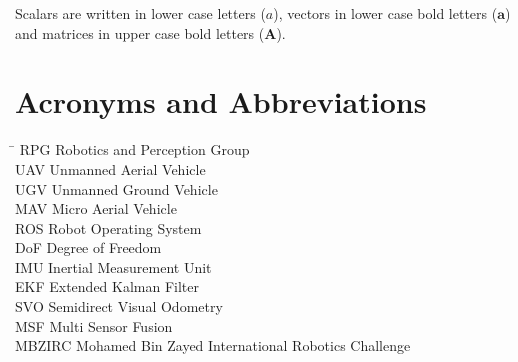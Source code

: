 Scalars are written in lower case letters ($a$), vectors in lower case bold letters ($\mathbf{a}$) and matrices in upper case bold letters ($\mathbf{A}$).

\section*{Acronyms and Abbreviations}
  \begin{tabbing}
    \hspace*{1.6cm}  \= \kill
    RPG     \> Robotics and Perception Group \\[0.5ex]
    UAV     \> Unmanned Aerial Vehicle \\[0.5ex]
    UGV     \> Unmanned Ground Vehicle \\[0.5ex]
    MAV     \> Micro Aerial Vehicle \\[0.5ex]
    ROS     \> Robot Operating System \\[0.5ex]
    DoF     \> Degree of Freedom \\[0.5ex]
    IMU     \> Inertial Measurement Unit \\[0.5ex]
    EKF   \> Extended Kalman Filter \\[0.5ex]
    SVO   \> Semidirect Visual Odometry \\[0.5ex]
    MSF   \> Multi Sensor Fusion \\[0.5ex]
    MBZIRC    \> Mohamed Bin Zayed International Robotics Challenge \\[0.5ex]
  \end{tabbing}

\clearpage

